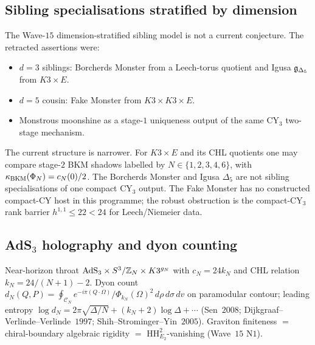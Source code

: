 \subsection{Sibling specialisations stratified by dimension}
\label{wn:subsec:plat-siblings-by-d}

\begin{conjecture}\ClaimStatusRetracted
\label{wn:conj:plat-siblings-dim}
The Wave-$15$ dimension-stratified sibling model is not a current
conjecture.  The retracted assertions were:
\begin{itemize}
\item $d=3$ siblings: Borcherds Monster from a Leech-torus quotient and
Igusa $\mathfrak{g}_{\Delta_5}$ from $K3\times E$.
\item $d=5$ cousin: Fake Monster from $K3\times K3\times E$.
\item Monstrous moonshine as a stage-$1$ uniqueness output of the same
CY$_3$ two-stage mechanism.
\end{itemize}
The current structure is narrower.  For $K3\times E$ and its CHL
quotients one may compare stage-$2$ BKM shadows labelled by
$N\in\{1,2,3,4,6\}$, with $\kappa_{\mathrm{BKM}}(\Phi_N)=c_N(0)/2$.  The Borcherds
Monster and Igusa $\Delta_5$ are not sibling specialisations of one
compact CY$_3$ output.  The Fake Monster has no constructed compact-CY
host in this programme; the robust obstruction is the compact-CY$_3$
rank barrier $h^{1,1}\leq 22<24$ for Leech/Niemeier data.
\end{conjecture}

\subsection{AdS$_3$ holography and dyon counting}
\label{wn:subsec:plat-AdS3}

\begin{theorem}\ClaimStatusTheorem
\label{wn:thm:plat-AdS3}
Near-horizon throat $\mathrm{AdS}_3 \times S^3/\mathbb{Z}_N \times K3^{g_N}$
with $c_N = 24 k_N$ and CHL relation $k_N = 24/(N+1) - 2$.
Dyon count
$d_N(Q, P) = \oint_{\mathcal{C}_N}
e^{-i\pi(Q \cdot \Omega)} / \Phi_{k_N}(\Omega)^2 \,
d\rho\, d\sigma\, dv$
on paramodular contour; leading entropy
$\log d_N = 2\pi\sqrt{\Delta/N} + (k_N + 2)\log\Delta + \cdots$
(Sen~$2008$; Dijkgraaf--Verlinde--Verlinde~$1997$;
Shih--Strominger--Yin~$2005$). Graviton finiteness $=$
chiral-boundary algebraic rigidity $=$ $\mathrm{HH}^2_{E_2}$-vanishing
(Wave~$15$ N$1$).
\end{theorem}

